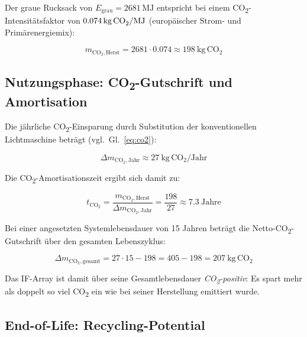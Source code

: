 ﻿\documentclass[12pt, a4paper]{report}
\theoremstyle{definition}
\theoremstyle{remark}
\begin{document}
Der graue Rucksack von $E_{\text{grau}} = 2681\,\text{MJ}$ entspricht bei
einem CO\textsubscript{2}-Intensitätsfaktor von $0.074\,\text{kg\,CO}_2/\text{MJ}$
(europäischer Strom- und Primärenergiemix):

\begin{equation}
  m_{\text{CO}_2,\text{Herst}} = 2681 \cdot 0.074 \approx \SI{198}{\kilo\gram\,\text{CO}_2}
  \label{eq:co2_herst}
\end{equation}

\subsection{\texorpdfstring{Nutzungsphase: CO\textsubscript{2}-Gutschrift und Amortisation}{Nutzungsphase: CO2-Gutschrift und Amortisation}}

Die jährliche CO\textsubscript{2}-Einsparung durch Substitution der
konventionellen Lichtmaschine beträgt (vgl.\ Gl.~\eqref{eq:co2}):

\begin{equation}
  \Delta m_{\text{CO}_2,\text{Jahr}} \approx \SI{27}{\kilo\gram\,\text{CO}_2\text{/Jahr}}
\end{equation}

Die CO\textsubscript{2}-Amortisationszeit ergibt sich damit zu:

\begin{equation}
  t_{\text{CO}_2} = \frac{m_{\text{CO}_2,\text{Herst}}}{\Delta m_{\text{CO}_2,\text{Jahr}}}
  = \frac{198}{27} \approx \SI{7.3}{\text{Jahre}}
  \label{eq:t_co2_amort}
\end{equation}

Bei einer angesetzten Systemlebensdauer von 15 Jahren beträgt die
Netto-CO\textsubscript{2}-Gutschrift über den gesamten Lebenszyklus:

\begin{equation}
  \Delta m_{\text{CO}_2,\text{gesamt}} = 27 \cdot 15 - 198
  = 405 - 198 = \SI{207}{\kilo\gram\,\text{CO}_2}
  \label{eq:co2_netto}
\end{equation}

Das IF-Array ist damit über seine Gesamtlebensdauer \emph{CO\textsubscript{2}-positiv}:
Es spart mehr als doppelt so viel CO\textsubscript{2} ein wie bei seiner
Herstellung emittiert wurde.

\subsection{End-of-Life: Recycling-Potential}
\end{document}
